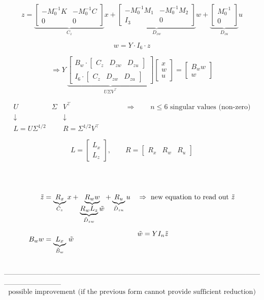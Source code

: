 \documentclass[11pt]{article}
\begin{document}
\[
z
=
\underbrace{
\begin{bmatrix}
- M_0^{-1} K & - M_0^{-1} C \\
0 & 0
\end{bmatrix}
}_{C_z}
x
+
\underbrace{
\begin{bmatrix}
- M_0^{-1} M_1 & - M_0^{-1} M_2 \\
I_3 & 0
\end{bmatrix}
}_{D_{zw}}
w
+
\underbrace{
\begin{bmatrix}
M_0^{-1} \\
0
\end{bmatrix}
}_{D_{zu}}
u
\]

\[
w = Y \cdot I_6 \cdot z
\]

\[
\Rightarrow
Y \,
\underbrace{
\begin{bmatrix}
B_w \cdot \begin{bmatrix} C_z & D_{zw} & D_{zu} \end{bmatrix} \\
I_6 \cdot \begin{bmatrix} C_z & D_{zw} & D_{zu} \end{bmatrix}
\end{bmatrix}
}_{U \Sigma V^\top}
\begin{bmatrix}
x \\
w \\
u
\end{bmatrix}
=
\begin{bmatrix}
B_w w \\
w
\end{bmatrix}
\]

\[
\begin{array}{ccccc}
U & \Sigma & V^\top & \qquad & \Rightarrow \qquad n \leq 6 \text{ singular values (non-zero)} \\[4pt]
\downarrow & & \downarrow \\[4pt]
L = U\Sigma^{1/2} & & R = \Sigma^{1/2}V^\top
\end{array}
\]

\[
L =
\begin{bmatrix}
L_x \\
L_z
\end{bmatrix},
\qquad
R =
\begin{bmatrix}
R_x & R_w & R_u
\end{bmatrix}
\]

\\
\\

\[
\begin{aligned}
\tilde z
&=
\underbrace{R_x}_{\tilde C_z} x
+
\underbrace{R_w w}_{\displaystyle \underbrace{R_w L_z}_{\tilde D_{zw}} \tilde w}
+
\underbrace{R_u}_{\tilde D_{zu}} u
&&\Rightarrow \text{ new equation to read out } \tilde z
\\[6pt]
B_w w
&=
\underbrace{L_x}_{\tilde B_w}\,\tilde w
&&\raisebox{1.8ex}{$\tilde w = Y I_n \tilde z$}
\end{aligned}
\]
\\
------------------------------------------------------------------------------------------------------------------------------------
\\
\[
\text{possible improvement (if the previous form cannot provide sufficient reduction)}
\]
\end{document}
